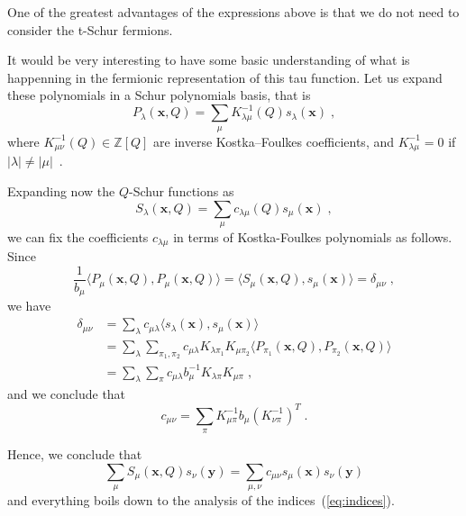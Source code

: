 \documentclass[a4paper,11pt]{amsart}
\begin{document}
One of the greatest advantages of the expressions above is that we do not 
need to consider the t-Schur fermions.

It would be very interesting to have some basic understanding of what
is happenning in the fermionic representation of this tau function.
Let us expand these polynomials in a Schur polynomials basis, that is
\begin{equation}
P_\lambda(\bm{x}, Q) = \sum_{\mu} K^{-1}_{\lambda \mu}(Q) s_\lambda(\bm{x})\; , 
\end{equation}
where \(K^{-1}_{\mu\nu}(Q) \in \mathbb{Z}[Q]\) are inverse
Kostka–Foulkes coefficients, and \(K^{-1}_{\lambda\mu} = 0 \) if
\(|\lambda|\neq |\mu|\)~\cite{Macdonald:1998, Wheeler:2018}.

Expanding now the \(Q\)-Schur functions as
\begin{equation}
  S_\lambda(\bm{x}, Q) = \sum_{\mu} c_{\lambda\mu}(Q) s_\mu(\bm{x})\; ,
\end{equation}
we can fix the coefficients \(c_{\lambda\mu}\) in terms of Kostka-Foulkes
polynomials as follows. Since~\cite{Macdonald:1998} 
\begin{equation}
  \frac{1}{b_\mu}\langle P_\mu(\bm{x}, Q), P_\mu(\bm{x}, Q)\rangle = \langle
  S_\mu(\bm{x}, Q), s_\mu(\bm{x})\rangle = \delta_{\mu\nu}\; ,  
\end{equation}
we have
\begin{equation}
  \begin{split}
\delta_{\mu\nu} & = \sum_\lambda c_{\mu\lambda}  \langle s_\lambda(\bm{x}), s_\mu(\bm{x})\rangle\\
& = \sum_\lambda \sum_{\pi_1, \pi_2} c_{\mu\lambda}  K_{\lambda \pi_1} K_{\mu \pi_2}
\langle P_{\pi_1}(\bm{x}, Q), P_{\pi_2}(\bm{x}, Q)\rangle \\ 
& = \sum_\lambda \sum_{\pi} c_{\mu\lambda} b_{\mu}^{-1}  K_{\lambda \pi} K_{\mu \pi}\; ,
  \end{split}
\end{equation}
and we conclude that 
\begin{equation}
\label{eq:indices}
c_{\mu \nu} = \sum_\pi K_{\mu\pi}^{-1} b_\mu (K_{\nu\pi}^{-1})^T\; .
\end{equation}

Hence, we conclude that 
\begin{equation}
\sum_{\mu} S_{\mu}(\bm{x},Q) s_{\nu}(\bm{y}) = 
\sum_{\mu , \nu} c_{\mu\nu} s_{\mu}(\bm{x}) s_{\nu}(\bm{y}) 
\end{equation}
and everything boils down to the analysis of the
indices~(\ref{eq:indices}).
\end{document}
